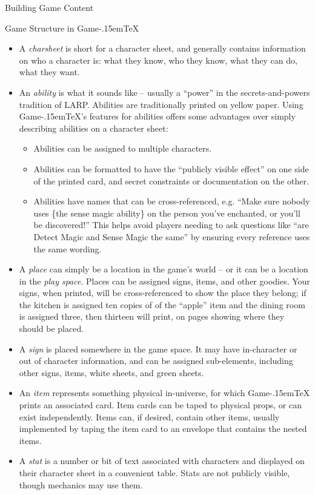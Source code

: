 \documentclass[11pt,  total={6in, 8in}]{article}
\def\gametex{\mbox{Game\kern-.15em\TeX}}
\begin{document}
\begin{section}{Building Game Content}
\begin{subsection}{Game Structure in \gametex{}}
\begin{itemize}
    \item A \textit{charsheet} is short for a character sheet, and generally contains information on who a character is: what they know, who they know, what they can do, what they want.
    \item An \textit{ability} is what it sounds like – usually a ``power'' in the secrets-and-powers tradition of LARP.  Abilities are traditionally printed on yellow paper.  Using \gametex{}'s features for abilities offers some advantages over simply describing abilities on a character sheet:
		\begin{itemize}
		\item Abilities can be assigned to multiple characters.
		\item Abilities can be formatted to have the ``publicly visible effect'' on one side of the printed card, and secret constraints or documentation on the other.
		\item Abilities have names that can be cross-referenced, e.g. ``Make sure nobody uses \{the sense magic ability\} on the person you've enchanted, or you'll be discovered!''  This helps avoid players needing to ask questions like ``are Detect Magic and Sense Magic the same'' by ensuring every reference uses the same wording.
		\end{itemize}
    \item A \textit{place} can simply be a location in the game's world -- or it can be a location in the \textit{play space}.  Places can be assigned signs, items, and other goodies.  Your signs, when printed, will be cross-referenced to show the place they belong; if the kitchen is assigned ten copies of of the ``apple'' item and the dining room is assigned three, then thirteen will print, on pages showing where they should be placed.
   \item A \textit{sign} is placed somewhere in the game space.  It may have in-character or out of character information, and can be assigned sub-elements, including other signs, items, white sheets, and green sheets.
  \item An \textit{item} represents something physical in-universe, for which \gametex{} prints an associated card.  Item cards can be taped to physical props, or can exist independently.  Items can, if desired, contain other items, usually implemented by taping the item card to an envelope that contains the nested items.
  \item A \textit{stat} is a number or bit of text associated with characters and displayed on their character sheet in a convenient table.  Stats are not publicly visible, though mechanics may use them.

\end{itemize}
\end{subsection}
\end{section}
\end{document}
